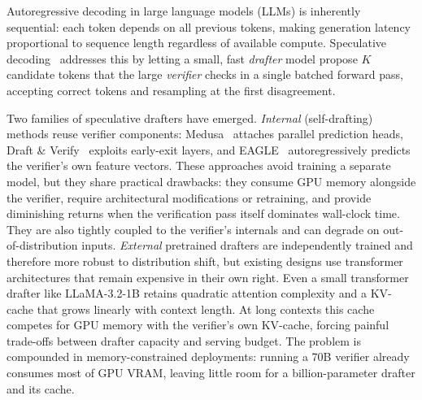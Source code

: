 Autoregressive decoding in large language models (LLMs) is inherently sequential: each token depends on all previous tokens, making generation latency proportional to sequence length regardless of available compute.
Speculative decoding~\citep{leviathan2023fast,chen2023accelerating} addresses this by letting a small, fast \emph{drafter} model propose $K$ candidate tokens that the large \emph{verifier} checks in a single batched forward pass, accepting correct tokens and resampling at the first disagreement.

Two families of speculative drafters have emerged.
\emph{Internal} (self-drafting) methods reuse verifier components: Medusa~\citep{cai2024medusa} attaches parallel prediction heads, Draft \& Verify~\citep{zhang2024draft} exploits early-exit layers, and EAGLE~\citep{li2024eagle} autoregressively predicts the verifier's own feature vectors.
These approaches avoid training a separate model, but they share practical drawbacks: they consume GPU memory alongside the verifier, require architectural modifications or retraining, and provide diminishing returns when the verification pass itself dominates wall-clock time.
They are also tightly coupled to the verifier's internals and can degrade on out-of-distribution inputs.
\emph{External} pretrained drafters are independently trained and therefore more robust to distribution shift, but existing designs use transformer architectures that remain expensive in their own right.
Even a small transformer drafter like LLaMA-3.2-1B retains quadratic attention complexity and a KV-cache that grows linearly with context length.
At long contexts this cache competes for GPU memory with the verifier's own KV-cache, forcing painful trade-offs between drafter capacity and serving budget.
The problem is compounded in memory-constrained deployments: running a 70B verifier already consumes most of GPU VRAM, leaving little room for a billion-parameter drafter and its cache.

